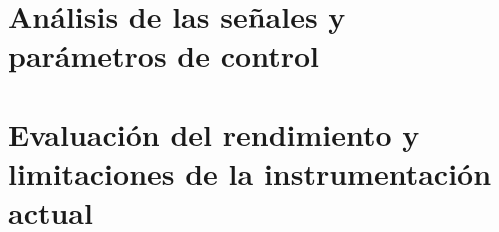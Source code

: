 
\section{Análisis de las señales y parámetros de control}
\section{Evaluación del rendimiento y limitaciones de la instrumentación actual}

